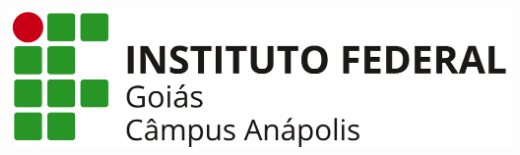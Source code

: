 \linespread{0.87}

\noindent\begin{minipage}[c][1.5cm][c]{3.5cm}
\includegraphics[width=1.5 \textwidth]{./outros/fig/IFGAnapolisHor2.png}
\end{minipage}\quad\quad\quad\qquad
\begin{minipage}{12cm}%
\scriptsize\textbf{\ministerio}\\%
\textbf{\secretaria}\\
\textbf{\instituto}\\
\textbf{\reitoria}\\
\end{minipage}
\vspace{1cm}


